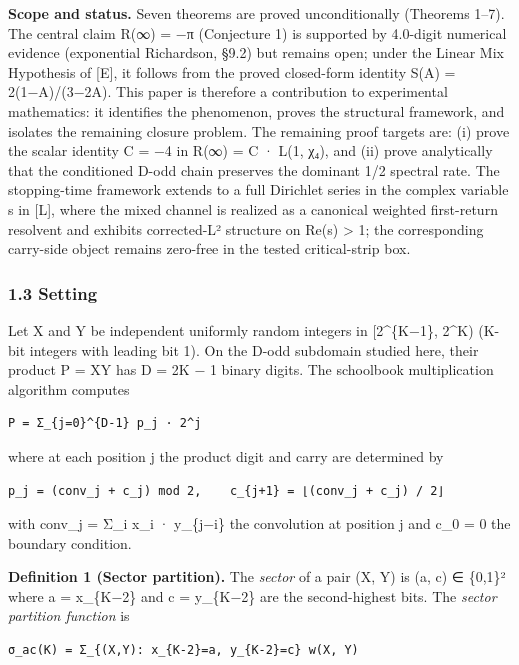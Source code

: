 \documentclass[
  11pt,
]{article}
\begin{document}
\textbf{Scope and status.} Seven theorems are proved unconditionally (Theorems
1--7). The central claim R(∞) = −π (Conjecture 1) is supported by 4.0-digit
numerical evidence (exponential Richardson, §9.2) but remains open; under the
Linear Mix Hypothesis of {[}E{]}, it follows from the proved closed-form
identity S(A) = 2(1−A)/(3−2A). This paper is therefore a contribution to
experimental mathematics: it identifies the phenomenon, proves the structural
framework, and isolates the remaining closure problem. The remaining proof
targets are: (i) prove the scalar identity C = −4 in R(∞) = C · L(1, χ₄), and
(ii) prove analytically that the conditioned D-odd chain preserves the dominant
1/2 spectral rate. The stopping-time framework extends to a full Dirichlet
series in the complex variable s in {[}L{]}, where the mixed channel is realized
as a canonical weighted first-return resolvent and exhibits corrected-L²
structure on Re(s) \textgreater{} 1; the corresponding carry-side object remains
zero-free in the tested critical-strip box.

\subsubsection{1.3 Setting}\label{setting}

Let X and Y be independent uniformly random integers in {[}2\^{}\{K−1\}, 2\^{}K)
(K-bit integers with leading bit 1). On the D-odd subdomain studied here, their
product P = XY has D = 2K − 1 binary digits. The schoolbook multiplication
algorithm computes

\begin{verbatim}
P = Σ_{j=0}^{D-1} p_j · 2^j
\end{verbatim}

where at each position j the product digit and carry are determined by

\begin{verbatim}
p_j = (conv_j + c_j) mod 2,    c_{j+1} = ⌊(conv_j + c_j) / 2⌋
\end{verbatim}

with conv\_j = Σ\_i x\_i · y\_\{j−i\} the convolution at position j and c\_0 = 0
the boundary condition.

\textbf{Definition 1 (Sector partition).} The \emph{sector} of a pair (X, Y) is
(a, c) ∈ \{0,1\}² where a = x\_\{K−2\} and c = y\_\{K−2\} are the second-highest
bits. The \emph{sector partition function} is

\begin{verbatim}
σ_ac(K) = Σ_{(X,Y): x_{K-2}=a, y_{K-2}=c} w(X, Y)
\end{verbatim}
\end{document}
